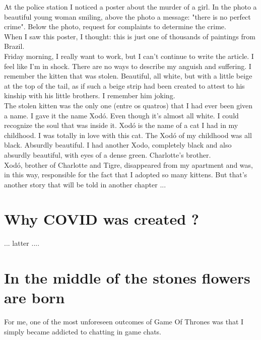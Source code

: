\documentclass[11pt]{book}
\begin{document}
\noindent At the police station I noticed a poster about the murder of a girl. In the photo a beautiful young woman smiling, above the photo a message: "there is no perfect crime". Below the photo, request for complaints to determine the crime. \\

\noindent When I saw this poster, I thought: this is just one of thousands of paintings from Brazil. \\

\noindent Friday morning, I really want to work, but I can't continue to write the article. I feel like I'm in shock. There are no ways to describe my anguish and suffering. I remember the kitten that was stolen. Beautiful, all white, but with a little beige at the top of the tail, as if such a beige strip had been created to attest to his kinship with his little brothers. I remember him joking. \\

\noindent The stolen kitten was the only one (entre os quatros) that I had ever been given a name. I gave it the name Xodó. Even though it's almost all white. I could recognize the soul that was inside it. Xodó is the name of a cat I had in my childhood. I was totally in love with this cat. The Xodó of my childhood was all black. Absurdly beautiful. I had another Xodo, completely black and also absurdly beautiful, with eyes of a dense green. Charlotte's brother. \\

\noindent Xodó, brother of Charlotte and Tigre, disappeared from my apartment and was, in this way, responsible for the fact that I adopted so many kittens. But that's another story that will be told in another chapter ... \\

\chapter{Why COVID was created ?}

... latter ....

\chapter{In the middle of the stones flowers are born}

\noindent For me, one of the most unforeseen outcomes of Game Of Thrones was that I simply became addicted to chatting in game chats. \\
\end{document}

